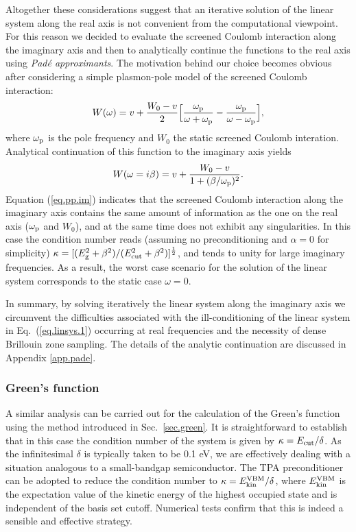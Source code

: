 \documentclass[twocolumn,prb,showpacs,superscriptaddress]{revtex4}
\def\w{\omega}
\begin{document}
Altogether these considerations suggest that an iterative solution of the
linear system along the real axis is not convenient from the computational
viewpoint. For this reason we decided to evaluate the screened Coulomb interaction 
along the imaginary axis and then to analytically continue the functions
to the real axis using {\it Pad\'e approximants}.\cite{pade1,pade2,blochl}
The motivation behind our choice becomes obvious after considering a simple
plasmon-pole model of the screened Coulomb interaction:\cite{hl86}
  \begin{equation}
  W(\w) = v + \frac{W_0 -v}{2} \Big[ \frac{\w_{\rm p}}{\w+\w_{\rm p}} - \frac{\w_{\rm p}}{\w-\w_{\rm p}} \Big],
  \end{equation}
where $\w_{\rm p}$ is the pole frequency and $W_0$ the static screened Coulomb interation.
Analytical continuation of this function to the imaginary axis yields
  \begin{equation} \label{eq.pp.im}
  W(\w=i\beta) = v + \frac{W_0 -v}{1+(\beta/\w_{\rm p})^2}.
  \end{equation}
Equation (\ref{eq.pp.im}) indicates that the screened Coulomb interaction along the imaginary axis contains the same
amount of information as the one on the real axis ($\w_{\rm p}$ and $W_0$), and at the same time
does not exhibit any singularities. In this case the condition number reads
(assuming no preconditioning and $\alpha=0$ for simplicity) 
$\kappa=[(E_{\rm g}^2+\beta^2)/(E_{\rm cut}^2+\beta^2)]^\frac{1}{2}$,
and tends to unity for large imaginary frequencies.
As a result, the worst case scenario for the solution 
of the linear system corresponds to the static case $\w=0$.

In summary, by solving iteratively the linear system along the imaginary
axis we circumvent the difficulties associated with the ill-conditioning
of the linear system in Eq.\ (\ref{eq.linsys.1}) occurring at real frequencies
and the necessity of dense Brillouin zone sampling.
The details of the analytic continuation are discussed in Appendix \ref{app.pade}.

\subsubsection{Green's function}

A similar analysis can be carried out for the calculation of the Green's
function using the method introduced in Sec.\ \ref{sec.green}.
It is straightforward to establish that in this case the condition number
of the system is given by $\kappa = E_{\rm cut}/\delta$.
As the infinitesimal $\delta$ is typically taken to be 0.1 eV, we are effectively
dealing with a situation analogous to a small-bandgap semiconductor.
The TPA preconditioner can be adopted to reduce the condition number
to $\kappa = E_{\rm kin}^{\rm VBM}/\delta$, where $E_{\rm kin}^{\rm VBM}$
is the expectation value of the kinetic energy of the highest occupied state
and is independent of the basis set cutoff. Numerical tests confirm that this 
is indeed a sensible and effective strategy.
\end{document}
